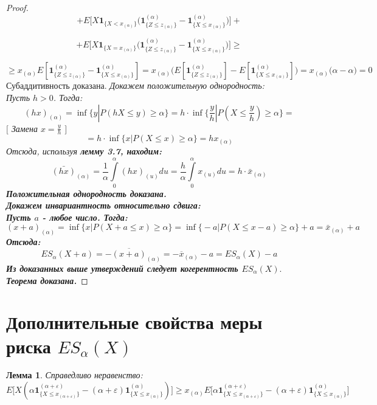\documentclass[18pt,a4paper]{article}
\theoremstyle{plain}
\newtheorem{Lemma}{Лемма}[section]
\theoremstyle{definition}
\begin{document}
\begin{proof}
$$
+E\Big[X\mathbf{1}_{\{X < x_{(\alpha)}\}}\big(\mathbf{1}^{(\alpha)}_{\{Z \le z_{(\alpha)}  \}} - \mathbf{1}^{(\alpha)}_{\{X \le x_{(\alpha)}  \}}  \big) \Big]+
$$

$$
+E\Big[X\mathbf{1}_{\{X = x_{(\alpha)}\}}\big(\mathbf{1}^{(\alpha)}_{\{Z \le z_{(\alpha)}  \}} - \mathbf{1}^{(\alpha)}_{\{X \le x_{(\alpha)}  \}}  \big) \Big] \ge
$$

$$
\ge x_{(\alpha)}E[\mathbf{1}^{(\alpha)}_{\{Z \le z_{(\alpha)}  \}} - \mathbf{1}^{(\alpha)}_{\{X \le x_{(\alpha)}  \}}]
=x_{(\alpha)}\Big(E[\mathbf{1}^{(\alpha)}_{\{Z \le z_{(\alpha)}  \}}] - E[\mathbf{1}^{(\alpha)}_{\{X \le x_{(\alpha)}  \}}]\Big) =x_{(\alpha)}\Big(\alpha - \alpha\Big) = 0
$$
Субаддитивность доказана.
\hspace{20pt} \it Докажем положительную однородность:\rm\\
Пусть $h>0$. Тогда:\\
$$
(hx)_{(\alpha)} = \inf\Big\{y|P(hX \le y) \ge \alpha  \Big\} = h \cdot \inf\Big\{\frac{y}{h}|P(X \le \frac{y}{h}) \ge \alpha  \Big\}=
$$
\center
$\Big[$ Замена $x = \frac{y}{h}$ $\Big]$
\flushleft
$$
=h\cdot \inf\Big\{x|P(X \le x) \ge \alpha  \Big\} = h x_{(\alpha)}
$$
Отсюда, используя \bf{лемму 3.7}\rm, находим:
$$
\bar{(hx)}_{(\alpha)} = \frac{1}{\alpha}\int\limits^\alpha_0 (hx)_{(u)}du = \frac{h}{\alpha}\int\limits^\alpha_0 x_{(u)}du = h \cdot \bar{x}_{(\alpha)}
$$
Положительная однородность доказана.\\
\hspace{20pt} \it Докажем инвариантность относительно сдвига:\rm\\
Пусть $a$ - любое число. Тогда:\\
$$
(x+a)_{(\alpha)} = \inf \Big\{x|P(X+a \le x) \ge \alpha  \Big\} = \inf \Big\{-a|P(X \le x-a) \ge \alpha  \Big\} +a = \bar{x}_{(\alpha)} + a
$$
Отсюда:\\
$$
ES_\alpha(X+a) = -\overline{(x+a)}_{(\alpha)} = - \overline{x}_{(\alpha)} - a = ES_\alpha (X) - a
$$
Из доказанных выше утверждений следует когерентность $ES_\alpha (X).$\\
Теорема доказана.
\end{proof}

\centering\section{Дополнительные свойства меры риска $ES_\alpha(X)$}
\flushleft

\begin{Lemma}
Справедливо неравенство:
\begin{equation}
E\Big[X(\alpha\mathbf{1}^{(\alpha + \varepsilon)}_{\{X \le x_{(\alpha + \varepsilon)}  \} } - (\alpha + \varepsilon)\mathbf{1}^{(\alpha)}_{\{X \le x_{(\alpha)}  \} } )\Big] \ge
x_{(\alpha)}E\Big[\alpha\mathbf{1}^{(\alpha + \varepsilon)}_{\{X \le x_{(\alpha + \varepsilon)}  \} } - (\alpha + \varepsilon)\mathbf{1}^{(\alpha)}_{\{X \le x_{(\alpha)}  \} }   \Big]
\end{equation}
\end{Lemma}
\end{document}

